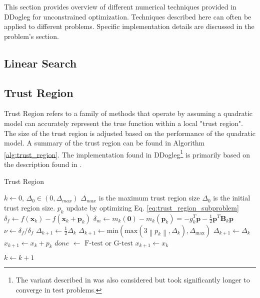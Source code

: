 \documentclass[peerreview,onecolumn]{IEEEtran}
\newcommand{\norm}[1]{\left\lVert#1\right\rVert}
\begin{document}
This section provides overview of different numerical techniques provided in DDogleg for unconstrained optimization. Techniques described here can often be applied to different problems. Specific implementation details are discussed in the problem's section.
\subsection{Linear Search}

\subsection{Trust Region}
Trust Region refers to a family of methods that operate by assuming a quadratic model can accurately represent the true function within a local "trust region". The size of the trust region is adjusted based on the performance of the quadratic model. A summary of the trust region can be found in Algorithm \ref{alg:trust_region}. The implementation found in DDogleg\footnote{The variant described in \cite{numopt2006,fletcher1987} was also considered but took significantly longer to converge in test problems.} is primarily based on the description found in \cite{IMM2004}.

\begin{algorithm}{}
\caption{\label{alg:trust_region}Trust Region}
\begin{algorithmic}[1]
	\State $k \gets 0$, $\Delta_0 \in (0,\Delta_{max})$
	\State \quad $\Delta_{max}$ is the maximum trust region size
	\State \quad $\Delta_{0}$ is the initial trust region size. 
	\State $p_k$ update by optimizing Eq. \ref{eq:trust_region_subproblem} 
	\State $\delta_f \gets f(\bm{x}_k) - f(\bm{x}_k + \bm{p}_k)$ 
	\State $\delta_m \gets m_k(\bm{0})-m_k(\bm{p}_k) = -g^T_k \bm{p} - \frac{1}{2}\bm{p}^T \bm{B}_k \bm{p}$ 
	\State $\nu \gets \delta_f / \delta_f$  
	 
		\State $\Delta_{k+1} \gets \frac{1}{2}\Delta_k$
	\Else
			\State $\Delta_{k+1} \gets \mbox{min}(\mbox{max}(3\norm{p_k},\Delta_k),\Delta_{\mbox{max}})$
		\Else
			\State $\Delta_{k+1} \gets \Delta_k$
		\EndIf
	\EndIf
	 
		\State $x_{k+1} \gets x_k + p_k$ 
		\State $done$ $\gets$ $\mbox{F-test}$ or $\mbox{G-test}$ 
	\Else
		\State $x_{k+1} \gets x_k$
	\EndIf

	\State $k \gets k + 1$
	\EndWhile
\end{algorithmic}
\end{algorithm}
\end{document}
